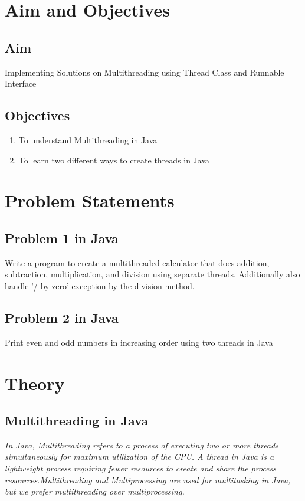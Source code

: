 \documentclass[11pt]{article}
\begin{document}
\tableofcontents
\thispagestyle{empty}
\clearpage


\setcounter{page}{1}

\section{Aim and Objectives}
\subsection*{Aim}
Implementing Solutions on Multithreading using Thread Class and Runnable Interface
\subsection*{Objectives}
\begin{enumerate}
	\item To understand Multithreading in Java
	\item To learn two different ways to create threads in Java
\end{enumerate}
\section{Problem Statements}

\subsection{Problem 1 in Java}
Write a program to create a multithreaded calculator that does addition, subtraction,
multiplication, and division using separate threads.
Additionally also handle '/ by zero' exception by the division method.

\subsection{Problem 2 in Java}
Print even and odd numbers in increasing order using two threads in Java

\section{Theory}
\subsection{Multithreading in Java}
\textit{
	In Java, Multithreading refers to a process of executing two or more threads simultaneously for maximum utilization of the CPU. A thread in Java is a lightweight process requiring fewer resources to create and share the process resources.Multithreading and Multiprocessing are used for multitasking in Java, but we prefer multithreading over multiprocessing.
}
\end{document}
